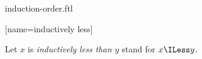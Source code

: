 \documentclass{stex}
\begin{document}
\begin{smodule}{induction-order.ftl}

[name=inductively less]{\mathrel{\comp\prec}}

\begin{forthel}
  \begin{convention}
    Let $x$ is \emph{inductively less than $y$} stand for $x \ILess y$.
  \end{convention}
\end{forthel}

\end{smodule}
\end{document}
